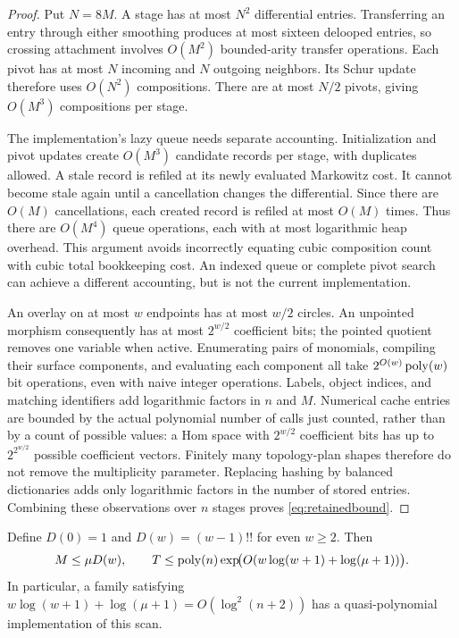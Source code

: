 \begin{proof}
Put $N=8M$.  A stage has at most $N^2$ differential entries.  Transferring an
entry through either smoothing produces at most sixteen delooped entries,
so crossing attachment involves $O(M^2)$ bounded-arity transfer operations.
Each pivot has at most $N$ incoming and $N$ outgoing neighbors.  Its Schur
update therefore uses $O(N^2)$ compositions.  There are at most $N/2$ pivots,
giving $O(M^3)$ compositions per stage.

The implementation's lazy queue needs separate accounting.  Initialization
and pivot updates create $O(M^3)$ candidate records per stage, with duplicates
allowed.  A stale record is refiled at its newly evaluated Markowitz cost.
It cannot become stale again until a cancellation changes the differential.
Since there are $O(M)$ cancellations, each created record is refiled at most
$O(M)$ times.  Thus there are $O(M^4)$ queue operations, each with at most
logarithmic heap overhead.  This argument avoids incorrectly equating cubic
composition count with cubic total bookkeeping cost.  An indexed queue or
complete pivot search can achieve a different accounting, but is not the
current implementation.

An overlay on at most $w$ endpoints has at most $w/2$ circles.  An unpointed
morphism consequently has at most $2^{w/2}$ coefficient bits; the pointed
quotient removes one variable when active.  Enumerating pairs of monomials,
compiling their surface components, and evaluating each component all take
$2^{O(w)}\operatorname{poly}(w)$ bit operations, even with naive integer operations.
Labels, object indices, and matching identifiers add logarithmic factors in
$n$ and $M$.  Numerical cache entries are bounded by the actual polynomial
number of calls just counted, rather than by a count of possible values:
a Hom space with $2^{w/2}$ coefficient bits has up to
$2^{2^{w/2}}$ possible coefficient vectors.  Finitely many topology-plan
shapes therefore do not remove the multiplicity parameter.  Replacing
hashing by balanced dictionaries adds only logarithmic factors in the
number of stored entries.  Combining these observations over $n$ stages proves
\eqref{eq:retainedbound}.
\end{proof}

\begin{corollary}
\label{cor:multiplicitycriterion}
Define $D(0)=1$ and $D(w)=(w-1)!!$ for even $w\geq2$.  Then
\[
 M\leq\mu D(w),\qquad
 T\leq\operatorname{poly}(n)\exp\!\bigl(O(w\log(w+1)+\log(\mu+1))\bigr).
\]
In particular, a family satisfying
$w\log(w+1)+\log(\mu+1)=O(\log^2(n+2))$
has a quasi-polynomial implementation of this scan.
\end{corollary}

